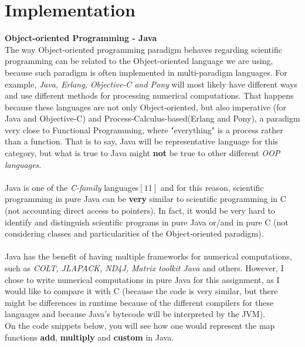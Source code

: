 \documentclass[conference]{IEEEtran}
\begin{document}
\section{Implementation}

\textbf{ Object-oriented Programming - Java }\\
The way Object-oriented programming paradigm behaves regarding scientific programming can be related to the Object-oriented language we are using, because such paradigm is often implemented in multi-paradigm languages. For example, \textit{Java, Erlang, Objective-C and Pony} will most likely have different ways and use different methods for processing numerical computations. That happens because these languages are not only Object-oriented, but also imperative (for Java and Objective-C) and Process-Calculus-based(Erlang and Pony), a paradigm very close to Functional Programming, where "everything" is a process rather than a function. That is to say, Java will be representative language for this category, but what is true to Java might \textbf{not} be true to other different \textit{OOP languages}.
\\\\
Java is one of the \textit{C-family} languages$[11]$ and for this reason, scientific programming in pure Java can be \textbf{very} similar to scientific programming in C (not accounting direct access to pointers). In fact, it would be very hard to identify and distinguish scientific programs in pure Java or/and in pure C (not considering classes and particularities of the Object-oriented paradigm).
\\\\
Java has the benefit of having multiple frameworks for numerical computations, such as \textit{COLT, JLAPACK, ND4J, Matrix toolkit Java} and others. However, I chose to write numerical computations in pure Java for this assignment, as I would like to compare it with C (because the code is very similar, but there might be differences in runtime because of the different compilers for these languages and because Java's bytecode will be interpreted by the JVM). 
\\
On the code snippets below, you will see how one would represent the map functions \textbf{add}, \textbf{multiply} and \textbf{custom} in Java.
\\
\end{document}
